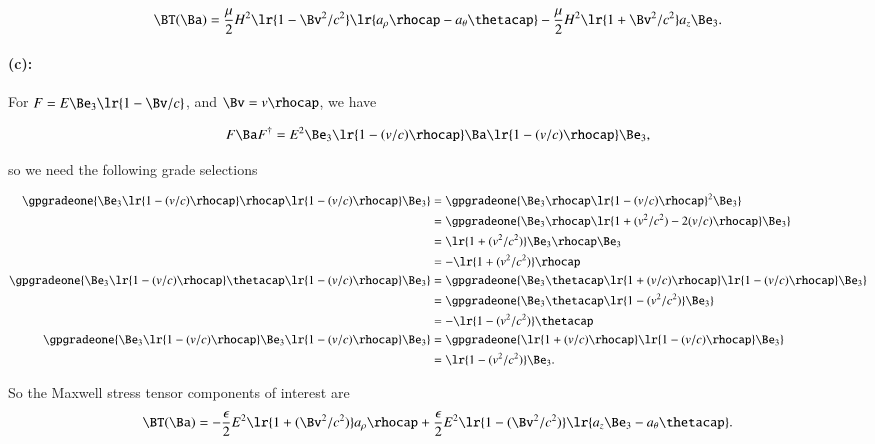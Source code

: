 \begin{dmath}\label{eqn:poyntingStaticExamples:1180}
\BT(\Ba) =
\frac{\mu}{2} H^2 \lr{1 -\Bv^2/c^2} \lr{ a_\rho \rhocap - a_\theta \thetacap }
-\frac{\mu}{2} H^2 \lr{1 +\Bv^2/c^2} a_z \Be_3.
\end{dmath}

\paragraph{(c):}

For \( F = E \Be_3 \lr{ 1 - \Bv/c } \), and \( \Bv = v \rhocap \), we have

\begin{dmath}\label{eqn:poyntingStaticExamples:1220}
F \Ba F^\dagger
=
E^2 \Be_3 \lr{ 1 - (v/c) \rhocap } \Ba \lr{ 1 - (v/c) \rhocap } \Be_3,
\end{dmath}

so we need the following grade selections

\begin{equation}\label{eqn:poyntingStaticExamples:1260}
\begin{aligned}
\gpgradeone{ \Be_3 \lr{ 1 - (v/c) \rhocap } \rhocap \lr{ 1 - (v/c) \rhocap } \Be_3 }
&=
\gpgradeone{ \Be_3 \rhocap \lr{ 1 - (v/c) \rhocap }^2 \Be_3 } \\
&=
\gpgradeone{ \Be_3 \rhocap \lr{ 1 + (v^2/c^2) - 2 (v/c) \rhocap } \Be_3 } \\
&=
\lr{ 1 + (v^2/c^2) } \Be_3 \rhocap \Be_3 \\
&=
-\lr{ 1 + (v^2/c^2) } \rhocap \\
\gpgradeone{ \Be_3 \lr{ 1 - (v/c) \rhocap } \thetacap \lr{ 1 - (v/c) \rhocap } \Be_3 }
&=
\gpgradeone{ \Be_3 \thetacap \lr{ 1 + (v/c) \rhocap } \lr{ 1 - (v/c) \rhocap } \Be_3 } \\
&=
\gpgradeone{ \Be_3 \thetacap \lr{ 1 - (v^2/c^2) } \Be_3 } \\
&=
-\lr{ 1 - (v^2/c^2) } \thetacap \\
\gpgradeone{ \Be_3 \lr{ 1 - (v/c) \rhocap } \Be_3 \lr{ 1 - (v/c) \rhocap } \Be_3 }
&=
\gpgradeone{ \lr{ 1 + (v/c) \rhocap } \lr{ 1 - (v/c) \rhocap } \Be_3 } \\
&=
\lr{ 1 - (v^2/c^2) } \Be_3.
\end{aligned}
\end{equation}

So the Maxwell stress tensor components of interest are
\begin{dmath}\label{eqn:poyntingStaticExamples:1320}
\BT(\Ba)
=
-\frac{\epsilon}{2} E^2 \lr{ 1 + (\Bv^2/c^2) } a_\rho \rhocap
+
\frac{\epsilon}{2} E^2 \lr{ 1 - (\Bv^2/c^2) } \lr{ a_z \Be_3 - a_\theta \thetacap }.
\end{dmath}

